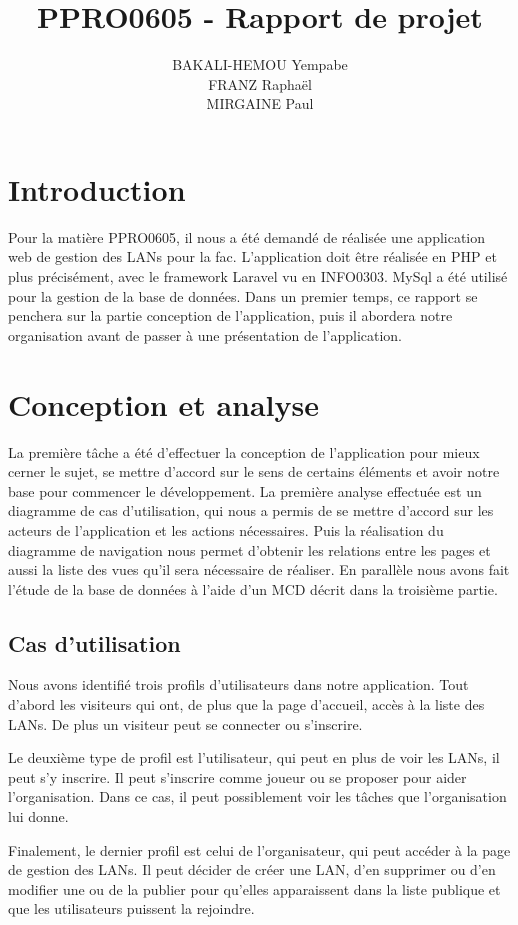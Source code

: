 \documentclass[12pt]{article}
\title{\textbf{PPRO0605 - Rapport de projet}}
\author{
		BAKALI-HEMOU Yempabe\\
		FRANZ Raphaël\\
		MIRGAINE Paul
		}
\date{}
\begin{document}


\section*{Introduction}

Pour la matière PPRO0605, il nous a été demandé de réalisée une application web de gestion des LANs pour la fac. L'application doit être réalisée en PHP et plus précisément, avec le framework Laravel vu en INFO0303. MySql a été utilisé pour la gestion de la base de données. Dans un premier temps, ce rapport se penchera sur la partie conception de l'application, puis il abordera notre organisation avant de passer à une présentation de l'application.
\tableofcontents

\newpage

\section{Conception et analyse}
La première tâche a été d'effectuer la conception de l'application pour mieux cerner le sujet, se mettre d'accord sur le sens de certains éléments et avoir notre base pour commencer le développement. La première analyse effectuée est un diagramme de cas d'utilisation, qui nous a permis de se mettre d'accord sur les acteurs de l'application et les actions nécessaires. Puis la réalisation du diagramme de navigation nous permet d'obtenir les relations entre les pages et aussi la liste des vues qu'il sera nécessaire de réaliser. En parallèle nous avons fait l'étude de la base de données à l'aide d'un MCD décrit dans la troisième partie.
\subsection{Cas d'utilisation}

Nous avons identifié trois profils d'utilisateurs dans notre application. Tout d'abord les visiteurs qui ont, de plus que la page d'accueil, accès à la liste des LANs. De plus un visiteur peut se connecter ou s'inscrire. 
\newline

Le deuxième type de profil est l'utilisateur, qui peut en plus de voir les LANs, il peut s'y inscrire. Il peut s'inscrire comme joueur ou se proposer pour aider l'organisation. Dans ce cas, il peut possiblement voir les tâches que l'organisation lui donne. 
\newline

Finalement, le dernier profil est celui de l'organisateur, qui peut accéder à la page de gestion des LANs. Il peut décider de créer une LAN, d'en supprimer ou d'en modifier une ou de la publier pour qu'elles apparaissent dans la liste publique et que les utilisateurs puissent la rejoindre.
\newline
\end{document}
